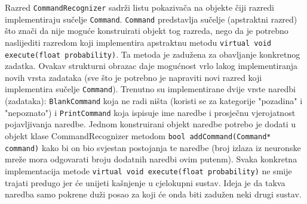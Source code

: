 Razred \texttt{CommandRecognizer} sadrži listu pokazivača na objekte čiji razredi implementiraju 
sučelje \texttt{Command}. \texttt{Command} predstavlja sučelje (apstraktni razred) što znači da
nije moguće konstruirati objekt tog razreda, nego da je potrebno naslijediti razredom koji 
implementira apstraktnu metodu \texttt{virtual void execute(float probability)}. Ta 
metoda je zadužena za obavljanje konkretnog zadatka. Ovakav strukturni
obrazac daje mogućnost vrlo lakog implementiranja novih vrsta zadataka (sve što je potrebno je 
napraviti novi razred koji implementira sučelje \texttt{Command}). Trenutno su implementirane
dvije vrste naredbi (zadataka): \texttt{BlankCommand} koja ne radi ništa (koristi se za kategorije
"pozadina" i "nepoznato") i \texttt{PrintCommand} koja ispisuje ime naredbe i prosječnu 
vjerojatnost pojavljivanja naredbe. Jednom konstruirani objekt naredbe potrebo je dodati 
u objekt klase CommandRecognizer metodom \texttt{bool addCommand(Command* command)} 
kako bi on bio svjestan postojanja te naredbe (broj izlaza iz neuronske mreže mora odgovarati 
broju dodatnih naredbi ovim putenm). Svaka konkretna implementacija metode 
\texttt{virtual void execute(float probability)} ne smije trajati predugo jer će unijeti 
kašnjenje u cjelokupni sustav. Ideja je da takva naredba samo pokrene duži posao za koji će onda
biti zadužen neki drugi sustav.